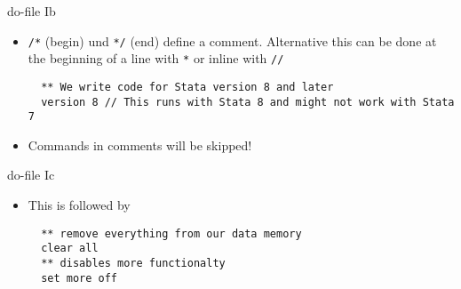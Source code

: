 \begin{frame}[fragile]{do-file Ib}
\begin{itemize} 
   \item \texttt{/*} (begin) und \texttt{*/} (end) define a comment. Alternative this can be done at the beginning of a line with \texttt{*} or inline with \texttt{//}
  
  \begin{lstlisting}
  ** We write code for Stata version 8 and later
  version 8 // This runs with Stata 8 and might not work with Stata 7
  \end{lstlisting}
  \item Commands in comments will be skipped!
  \end{itemize}
\end{frame}

\begin{frame}[fragile]{do-file Ic}
\begin{itemize}
  \item This is followed by
  
  \begin{lstlisting}
  ** remove everything from our data memory
  clear all
  ** disables more functionalty
  set more off
  \end{lstlisting}
  \end{itemize}
      

\end{frame}


